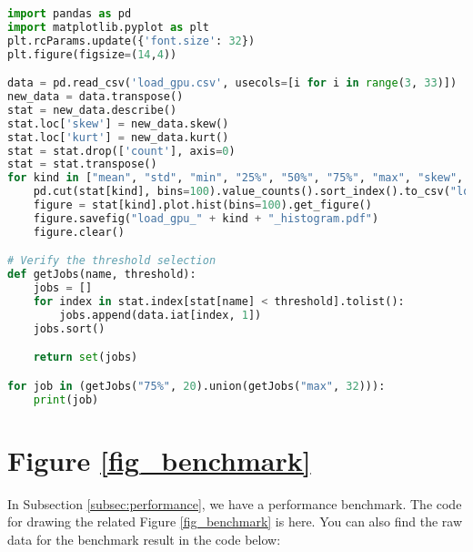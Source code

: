 \begin{lstlisting}[language=Python]
import pandas as pd
import matplotlib.pyplot as plt
plt.rcParams.update({'font.size': 32})
plt.figure(figsize=(14,4))

data = pd.read_csv('load_gpu.csv', usecols=[i for i in range(3, 33)])
new_data = data.transpose()
stat = new_data.describe()
stat.loc['skew'] = new_data.skew()
stat.loc['kurt'] = new_data.kurt()
stat = stat.drop(['count'], axis=0)
stat = stat.transpose()
for kind in ["mean", "std", "min", "25%", "50%", "75%", "max", "skew", "kurt"]:
    pd.cut(stat[kind], bins=100).value_counts().sort_index().to_csv("load_gpu_" + kind + "_histogram.csv")
    figure = stat[kind].plot.hist(bins=100).get_figure()
    figure.savefig("load_gpu_" + kind + "_histogram.pdf")
    figure.clear()

# Verify the threshold selection
def getJobs(name, threshold):
    jobs = []
    for index in stat.index[stat[name] < threshold].tolist():
        jobs.append(data.iat[index, 1])
    jobs.sort()

    return set(jobs)

for job in (getJobs("75%", 20).union(getJobs("max", 32))):
    print(job)
\end{lstlisting}

\section{Figure \ref{fig_benchmark}}
In Subsection \ref{subsec:performance}, we have a performance benchmark. The code for drawing the related Figure \ref{fig_benchmark} is here. You can also find the raw data for the benchmark result in the code below:

